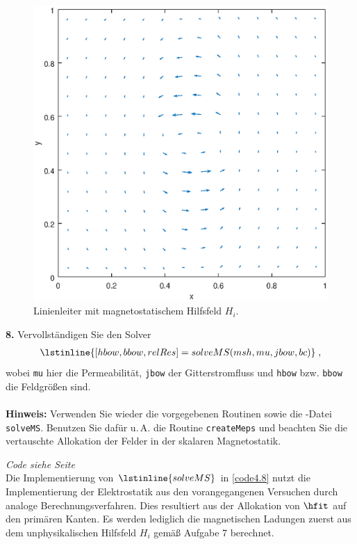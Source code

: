 \documentclass[./Protokollheft.tex]{subfiles}
\begin{document}
\begin{figure}[h]
\begin{center}
\includegraphics[scale=0.7]{eps/plotExampleHi}
\end{center}
\caption{Linienleiter mit magnetostatischem Hilfsfeld $H_i$.}
\label{fig:V4.PA7}
\end{figure}

 \label{v4.PA.8}
\begin{framed}
	\noindent \textbf{8.} Vervollständigen Sie den Solver
\begin{align}
\lstinline{[hbow, bbow, relRes] = solveMS(msh, mu, jbow, bc)} \; ,
\end{align}
wobei \lstinline{mu} hier die Permeabilität, \lstinline{jbow} der Gitterstromfluss und
\lstinline{hbow} bzw. \lstinline{bbow} die Feldgrößen sind.\\
\ \\
{\textbf{Hinweis:}} Verwenden Sie wieder die vorgegebenen Routinen sowie die \matlab-Datei \lstinline{solveMS}. Benutzen Sie
dafür u.\,A. die Routine \lstinline{createMeps} und beachten Sie die vertauschte Allokation der Felder in der skalaren Magnetostatik.\label{exer:solveMS}
\end{framed}

\textit{ Code siehe Seite \pageref{code4.8} } \\
Die Implementierung von $\lstinline{solveMS}$ in \ref{code4.8} nutzt die Implementierung der Elektrostatik aus den vorangegangenen Versuchen durch analoge Berechnungsverfahren. Dies resultiert aus der Allokation von $\hfit$ auf den primären Kanten. Es werden lediglich die magnetischen Ladungen zuerst aus dem unphysikalischen Hilfsfeld $H_i$ gemäß Aufgabe 7 berechnet.
\end{document}
